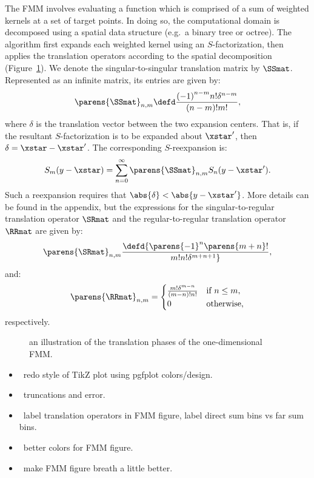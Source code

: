 The FMM involves evaluating a function which is comprised of a sum of
weighted kernels at a set of target points. In doing so, the
computational domain is decomposed using a spatial data structure
(e.g.\ a binary tree or octree). The algorithm first expands each
weighted kernel using an $S$-factorization, then applies the
translation operators according to the spatial decomposition
(Figure~\ref{fig:fmm}). We denote the singular-to-singular translation
matrix by $\SSmat$. Represented as an infinite matrix, its entries are
given by:
\begin{align}
  \label{eq:SSmat}
  \parens{\SSmat}_{n,m} \defd \frac{{(-1)}^{n-m} n! \delta^{n-m}}{(n-m)!m!},
\end{align}
where $\delta$ is the translation vector between the two expansion
centers. That is, if the resultant $S$-factorization is to be expanded
about $\xstar'$, then $\delta = \xstar - \xstar'$. The corresponding
$S$-reexpansion is:
\begin{align}
  \label{eq:SSmat-reexpansion}
  S_m(y - \xstar) = \sum_{n=0}^\infty \parens{\SSmat}_{n,m} S_n(y - \xstar').
\end{align}
Such a reexpansion requires that $\abs{\delta} < \abs{y -
  \xstar'}$. More details can be found in the appendix, but the
expressions for the singular-to-regular translation operator $\SRmat$
and the regular-to-regular translation operator $\RRmat$ are given by:
\begin{align}
  \label{eq:SRmat}
  \parens{\SRmat}_{n,m} \defd {\parens{-1}^n \parens{m + n}! \over m! n! \delta^{m+n+1}},
\end{align}
and:
\begin{align}
  \label{eq:RRmat}
  \parens{\RRmat}_{n,m} = \begin{cases}
    \frac{m! \delta^{m - n}}{(m - n)!n!} & \mbox{if } n \leq m, \\
    0 & \mbox{otherwise},
  \end{cases}
\end{align}
respectively.

\begin{figure}[h]
  \centering
  
  \caption{an illustration of the translation phases of the
    one-dimensional FMM.}\label{fig:fmm}
\end{figure}

\begin{itemize}
\item \TODO\ redo style of TikZ plot using pgfplot colors/design.
\item \TODO\ truncations and error.
\item \TODO\ label translation operators in FMM figure, label direct
  sum bins vs far sum bins.
\item \TODO\ better colors for FMM figure.
\item \TODO\ make FMM figure breath a little better.
\end{itemize}

